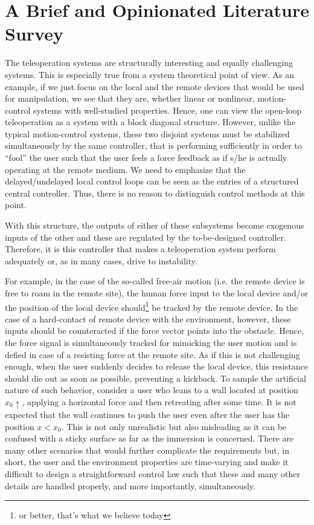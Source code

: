 
\chapter{A Brief and Opinionated Literature Survey}\label{chap:litsurvey}

The teleoperation systems are structurally interesting and equally challenging 
systems. This is especially true from a system theoretical point of view. As an example, 
if we just focus on the local and the remote devices that would be used for manipulation, 
we see that they are, whether linear or nonlinear, motion-control systems with well-studied 
properties. Hence, one can view the open-loop teleoperation as a system with a block 
diagonal structure. However, unlike the typical motion-control systems, these two disjoint systems must be stabilized 
simultaneously by the same controller, that is performing sufficiently in order to \enquote{fool} the user such that the user feels 
a force feedback as if s/he is actually operating at the remote medium. We need to emphasize that the 
delayed/undelayed local control loops can be seen as the entries of a structured central controller. Thus, there 
is no reason to distinguish control methods at this point.  

With this structure, the outputs of either of these subsystems become exogenous inputs of the other and these are regulated 
by the to-be-designed controller. Therefore, it is this controller that makes a teleoperation system perform 
adequately or, as in many cases, drive to instability.


For example, in the case of the so-called free-air motion (i.e. the remote device is free to roam in the remote site), the human force input 
to the local device and/or the position of the local device should\footnote{or better, that's what we believe today} 
be tracked by the remote device. In the case of a 
hard-contact of remote device with the environment, however, these inputs should be counteracted  if the force vector points into 
the obstacle. Hence, the force signal is simultaneously tracked for mimicking the user motion and  
is defied in case of a resisting force at the remote site. As if this is not challenging enough, 
when the user suddenly decides to release the local device, this resistance should die out as soon as possible, 
preventing a kickback. To sample the artificial nature of such behavior, consider a user who leans to a wall located at 
position $x_0\!\!\uparrow$, applying a horizontal force and then retreating after some time. It is not expected 
that the wall continues to push the user even after the user has the position $x<x_0$. This is not only unrealistic
but also misleading as it can be confused with a sticky surface as far as the immersion is concerned. There are many other 
scenarios that would further complicate the requirements but, in short, the user and the environment properties 
are time-varying and make it difficult to design a straightforward control law such that these and many other details are 
handled properly, and more importantly, simultaneously. 


